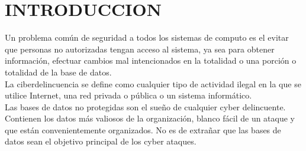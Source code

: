 \section{INTRODUCCION}
Un problema común de seguridad a todos los sistemas de computo es el evitar que personas no autorizadas tengan acceso al sistema, ya sea para obtener información, efectuar cambios mal intencionados en la totalidad o una porción o totalidad de la base de datos. \\

La ciberdelincuencia se define como cualquier tipo de actividad ilegal en la que se utilice Internet, una red privada o pública o un sistema informático. \\

Las bases de datos no protegidas son el sueño de cualquier cyber delincuente. Contienen los datos más valiosos de la organización, blanco fácil de un ataque y que están convenientemente organizados. No es de extrañar que las bases de datos sean el objetivo principal de los cyber ataques.